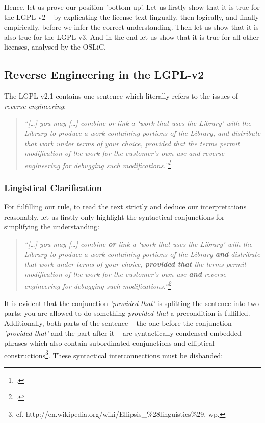 Hence, let us prove our position 'bottom up'. Let us firstly show that it is
true for the LGPL-v2 -- by explicating the license text lingually, then
logically, and finally empirically, before we infer the correct understanding.
Then let us show that it is also true for the LGPL-v3. And in the end let us
show that it is true for all other licenses, analysed by the OSLiC.

\subsection{Reverse Engineering in the LGPL-v2}
The LGPL-v2.1 contains one sentence which literally refers to the issues of 
\emph{reverse engineering}:

\begin{quote}\noindent\emph{\enquote{[\ldots] you may [\ldots] combine or link a
\enquote{work that uses the Library} with the Library to produce a work
containing portions of the Library, and distribute that work under terms of your
choice, provided that the terms permit modification of the work for the
customer's own use and \emph{reverse engineering} for debugging such
modifications.}\footcite[cf.][\nopage wp]{Lgpl21OsiLicense1999a}}
\end{quote}

\subsubsection{Lingistical Clarification}

For fulfilling our rule, to read the text strictly and deduce our
interpretations reasonably, let us firstly only highlight the syntactical
conjunctions for simplifying the understanding:

\begin{quote}\noindent\emph{\enquote{[\ldots] you may [\ldots] combine
\textbf{or} link a \enquote{work that uses the Library} with the Library to
produce a work containing portions of the Library \textbf{and} distribute that
work under terms of your choice, \textbf{provided that} the terms permit
modification of the work for the customer's own use \textbf{and} \emph{reverse
engineering} for debugging such modifications.}\footcite[cf.][\nopage wp. herv.
KR.]{Lgpl21OsiLicense1999a}}
\end{quote}

It is evident that the conjunction \emph{'provided that'} is splitting the
sentence into two parts: you are allowed to do something \emph{provided that} a
precondition is fulfilled. Additionally, both parts of the sentence --
the one before the conjunction \emph{'provided that'} and the part after it --
are syntactically condensed embedded phrases which also contain subordinated 
conjunctions and elliptical constructions\footnote{cf.
http://en.wikipedia.org/wiki/Ellipsis\_\%28linguistics\%29, wp.
}. These syntactical interconnections must be disbanded:

